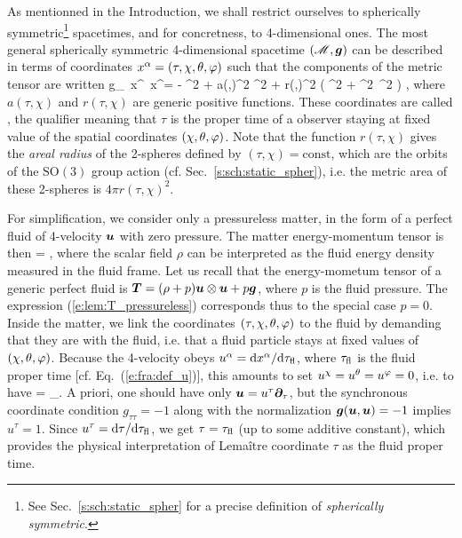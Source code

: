 As mentionned in the Introduction, we shall restrict ourselves to
spherically symmetric\footnote{See Sec.~\ref{s:sch:static_spher} for a precise
definition of \emph{spherically symmetric}.} spacetimes, and for concretness, to 4-dimensional ones. The most general spherically symmetric 4-dimensional spacetime $(\mathscr{M},\bm{g})$
can be described in terms of coordinates $x^\alpha=(\tau,\chi,\theta,\varphi)$ such that
the components of the metric tensor are written
\be \label{e:lem:metric_sync_coord}
    g_{\mu\nu}\, \D x^\mu \, \D x^\nu = - \D\tau^2 + a(\tau,\chi)^2 \D\chi^2
        + r(\tau,\chi)^2 \left( \D\th^2 + \sin^2\th\, \D\ph^2 \right)  ,
\ee
where $a(\tau,\chi)$ and $r(\tau,\chi)$ are generic positive functions.
These coordinates are called , the qualifier
 meaning that $\tau$ is the proper time of a observer staying
at fixed value of the spatial coordinates $(\chi,\theta,\varphi)$.
Note that the function $r(\tau,\chi)$ gives the \emph{areal radius}
of the 2-spheres
defined by $(\tau,\chi) = \mathrm{const}$, which are the orbits of the $\mathrm{SO}(3)$
group action (cf. Sec.~\ref{s:sch:static_spher}), i.e. the metric area of these
2-spheres is $4\pi r(\tau,\chi)^2$.

For simplification, we consider only a pressureless matter, in the form of a perfect
fluid of 4-velocity $\bm{u}$ with zero pressure. The matter energy-momentum tensor is then
\be \label{e:lem:T_pressureless}
     = \rho {} \otimes {} ,
\ee
where the scalar field $\rho$ can be interpreted as the fluid energy density
measured in the fluid frame. Let us recall that the energy-mometum tensor of a generic
perfect fluid is $\bm{T} = (\rho + p)\bm{u} \otimes \bm{u} + p \bm{g}$, where $p$
is the fluid pressure. The expression (\ref{e:lem:T_pressureless}) corresponds thus
to the special case $p=0$.
Inside the matter, we link the coordinates $(\tau,\chi,\theta,\varphi)$ to the fluid by demanding
that they are  with the fluid, i.e. that a fluid particle
stays at fixed values of $(\chi,\theta,\varphi)$.
Because the 4-velocity obeys $u^\alpha = \mathrm{d} x^\alpha/\mathrm{d} \tau_{\rm fl}$, where
$\tau_{\rm fl}$ is the fluid proper time [cf. Eq.~(\ref{e:fra:def_u})], this
amounts to set $u^\chi=u^\theta = u^\varphi = 0$, i.e. to have
\be \label{e:lem:u_par_tau}
     = \wpar_\tau .
\ee
A priori, one should have only $\bm{u} =  u^\tau\bm{\partial}_\tau$, but the
synchronous coordinate condition $g_{\tau\tau} = -1$ along with the
normalization $\bm{g}(\bm{u},\bm{u})=-1$ implies $u^\tau=1$. Since $u^\tau = \mathrm{d}\tau / \mathrm{d}\tau_{\rm fl}$, we get $\tau = \tau_{\rm fl}$ (up to some additive constant), which provides the physical
interpretation of Lemaître coordinate $\tau$ as the fluid proper time.

